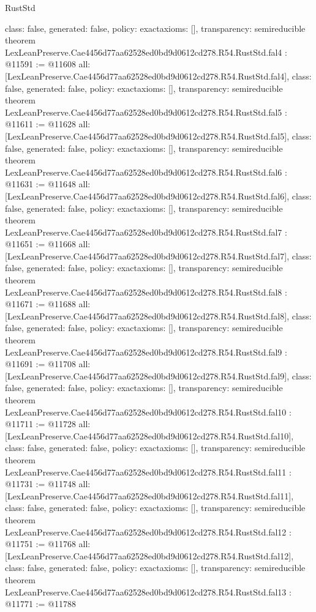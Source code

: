 \begin{lexlean}{RustStd}
\begin{coremodule}
{  class: false,
  generated: false,
  policy: exact{axioms: []},
  transparency: semireducible
}
theorem LexLeanPreserve.Cae4456d77aa62528ed0bd9d0612cd278.R54.RustStd.fal4 : @11591 := @11608 {
  all: [LexLeanPreserve.Cae4456d77aa62528ed0bd9d0612cd278.R54.RustStd.fal4],
  class: false,
  generated: false,
  policy: exact{axioms: []},
  transparency: semireducible
}
theorem LexLeanPreserve.Cae4456d77aa62528ed0bd9d0612cd278.R54.RustStd.fal5 : @11611 := @11628 {
  all: [LexLeanPreserve.Cae4456d77aa62528ed0bd9d0612cd278.R54.RustStd.fal5],
  class: false,
  generated: false,
  policy: exact{axioms: []},
  transparency: semireducible
}
theorem LexLeanPreserve.Cae4456d77aa62528ed0bd9d0612cd278.R54.RustStd.fal6 : @11631 := @11648 {
  all: [LexLeanPreserve.Cae4456d77aa62528ed0bd9d0612cd278.R54.RustStd.fal6],
  class: false,
  generated: false,
  policy: exact{axioms: []},
  transparency: semireducible
}
theorem LexLeanPreserve.Cae4456d77aa62528ed0bd9d0612cd278.R54.RustStd.fal7 : @11651 := @11668 {
  all: [LexLeanPreserve.Cae4456d77aa62528ed0bd9d0612cd278.R54.RustStd.fal7],
  class: false,
  generated: false,
  policy: exact{axioms: []},
  transparency: semireducible
}
theorem LexLeanPreserve.Cae4456d77aa62528ed0bd9d0612cd278.R54.RustStd.fal8 : @11671 := @11688 {
  all: [LexLeanPreserve.Cae4456d77aa62528ed0bd9d0612cd278.R54.RustStd.fal8],
  class: false,
  generated: false,
  policy: exact{axioms: []},
  transparency: semireducible
}
theorem LexLeanPreserve.Cae4456d77aa62528ed0bd9d0612cd278.R54.RustStd.fal9 : @11691 := @11708 {
  all: [LexLeanPreserve.Cae4456d77aa62528ed0bd9d0612cd278.R54.RustStd.fal9],
  class: false,
  generated: false,
  policy: exact{axioms: []},
  transparency: semireducible
}
theorem LexLeanPreserve.Cae4456d77aa62528ed0bd9d0612cd278.R54.RustStd.fal10 : @11711 := @11728 {
  all: [LexLeanPreserve.Cae4456d77aa62528ed0bd9d0612cd278.R54.RustStd.fal10],
  class: false,
  generated: false,
  policy: exact{axioms: []},
  transparency: semireducible
}
theorem LexLeanPreserve.Cae4456d77aa62528ed0bd9d0612cd278.R54.RustStd.fal11 : @11731 := @11748 {
  all: [LexLeanPreserve.Cae4456d77aa62528ed0bd9d0612cd278.R54.RustStd.fal11],
  class: false,
  generated: false,
  policy: exact{axioms: []},
  transparency: semireducible
}
theorem LexLeanPreserve.Cae4456d77aa62528ed0bd9d0612cd278.R54.RustStd.fal12 : @11751 := @11768 {
  all: [LexLeanPreserve.Cae4456d77aa62528ed0bd9d0612cd278.R54.RustStd.fal12],
  class: false,
  generated: false,
  policy: exact{axioms: []},
  transparency: semireducible
}
theorem LexLeanPreserve.Cae4456d77aa62528ed0bd9d0612cd278.R54.RustStd.fal13 : @11771 := @11788 {
}
\end{coremodule}
\end{lexlean}
